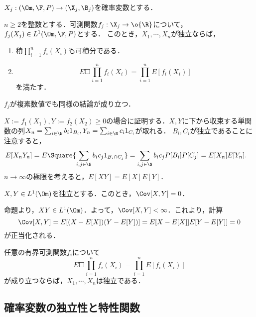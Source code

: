 \documentclass[uplatex,dvipdfmx]{jsreport}
\begin{document}
\begin{notation}
    $X_j:(\Om,\F,P)\to(\X_j,\B_j)$を確率変数とする．
\end{notation}

\begin{proposition}[独立確率変数の積は可積分]\label{prop-integrability-of-product-of-two-independent-rv}
    $n\ge 2$を整数とする．可測関数$f_j:\X_j\to\o{\R}$について，$f_j(X_j)\in L^1(\Om,\F,P)$とする．
    このとき，$X_1,\cdots,X_n$が独立ならば，
    \begin{enumerate}
        \item 積$\prod^n_{i=1}f_i(X_i)$も可積分である．
        \item \[E\Square{\prod^n_{i=1}f_i(X_i)}=\prod^n_{i=1}E[f_i(X_i)]\]
        を満たす．
    \end{enumerate}
    $f_j$が複素数値でも同様の結論が成り立つ．
\end{proposition}
\begin{Proof}
    $X:=f_1(X_1),Y:=f_2(X_2)\ge0$の場合に証明する．$X,Y$に下から収束する単関数の列$X_n=\sum_{i\in\N}b_i1_{B_i},Y_n=\sum_{i\in\N}c_i1_{C_i}$が取れる．
    $B_i,C_i$が独立であることに注意すると，
    \begin{align*}
        E[X_nY_n]&=E\Square{\sum_{i,j\in\N}b_ic_j1_{B_i\cap C_j}}=\sum_{i,j\in\N}b_ic_jP[B_i]P[C_j]=E[X_n]E[Y_n].
    \end{align*}
    $n\to\infty$の極限を考えると，$E[XY]=E[X]E[Y]$．
\end{Proof}

\begin{corollary}[独立ならば無相関]
    $X,Y\in L^1(\Om)$を独立とする．このとき，$\Cov[X,Y]=0$．
\end{corollary}
\begin{Proof}
    命題より，$XY\in L^1(\Om)$．よって，$\Cov[X,Y]<\infty$．これより，計算
    \[\Cov[X,Y]=E[(X-E[X])(Y-E[Y])]=E[X-E[X]]E[Y-E[Y]]=0\]
    が正当化される．
\end{Proof}

\begin{corollary}[独立性の十分条件]
    任意の有界可測関数$f_i$について
    \[E\Square{\prod^n_{i=1}f_i(X_i)}=\prod^n_{i=1}E[f_i(X_i)]\]
    が成り立つならば，$X_1,\cdots,X_n$は独立である．
\end{corollary}

\subsection{確率変数の独立性と特性関数}
\end{document}
